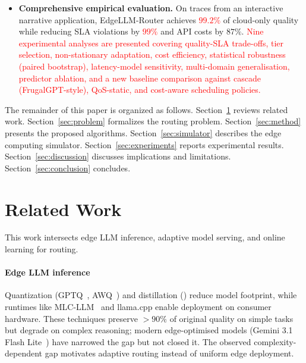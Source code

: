 \documentclass[final,3p,twocolumn,authoryear]{elsarticle}
\newcommand{\rev}[1]{\textcolor{red}{#1}}
\newcommand{\system}{EdgeLLM-Router\xspace}
\theoremstyle{plain}
\theoremstyle{definition}
\begin{document}
\begin{itemize}
  \item \textbf{Comprehensive empirical evaluation.}
        On traces from an interactive narrative application, \system{} achieves \rev{$99.2\%$} of cloud-only quality while reducing SLA violations by \rev{$99\%$} and API costs by $87\%$.
        \rev{Nine experimental analyses are presented covering quality-SLA trade-offs, tier selection, non-stationary adaptation, cost efficiency, statistical robustness (paired bootstrap), latency-model sensitivity, multi-domain generalisation, predictor ablation, and a new baseline comparison against cascade (FrugalGPT-style), QoS-static, and cost-aware scheduling policies.}
\end{itemize}

The remainder of this paper is organized as follows.
Section~\ref{sec:related} reviews related work.
Section~\ref{sec:problem} formalizes the routing problem.
Section~\ref{sec:method} presents the proposed algorithms.
Section~\ref{sec:simulator} describes the edge computing simulator.
Section~\ref{sec:experiments} reports experimental results.
Section~\ref{sec:discussion} discusses implications and limitations.
Section~\ref{sec:conclusion} concludes.

\section{Related Work}
\label{sec:related}

This work intersects edge LLM inference, adaptive model serving, and online learning for routing.

\paragraph{Edge LLM inference}
Quantization (GPTQ~\citep{frantar2022gptq}, AWQ~\citep{lin2024awq}) and distillation (\citep{hinton2015distilling,sanh2019distilbert,ho2023large,hsieh2023distilling}) reduce model footprint, while runtimes like MLC-LLM~\citep{mlc2023} and llama.cpp enable deployment on consumer hardware. These techniques preserve $>90\%$ of original quality on simple tasks but degrade on complex reasoning; modern edge-optimised models (Gemini 3.1 Flash Lite~\citep{googledeepmind2026gemini31flashlite}) have narrowed the gap but not closed it. The observed complexity-dependent gap motivates adaptive routing instead of uniform edge deployment.
\end{document}
